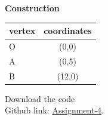 \documentclass[10pt,a4paper]{report}
\begin{document}
\begin{multicols}{2}
 \vspace{2mm} \textbf{Construction}
\begin{center}
\setlength{\arrayrulewidth}{0.5mm}
\setlength{\tabcolsep}{5pt}
\renewcommand{\arraystretch}{3}
    \begin{tabular}{|l|c|}
    \hline 
    \textbf{vertex} & \textbf{coordinates} \\ \hline
    O & (0,0)  \\ 
    A & (0,5)  \\
    B & (12,0) \\
    \hline
      \end{tabular}
  \end{center}
  
\raggedright  Download the code \\
Github link: \href{https://github.com/chiragshah1244/FWC/blob/main/assignments/assignment-1/code/src/seq.cpp}{Assignment-4}.
  \end{multicols}
\end{document}
